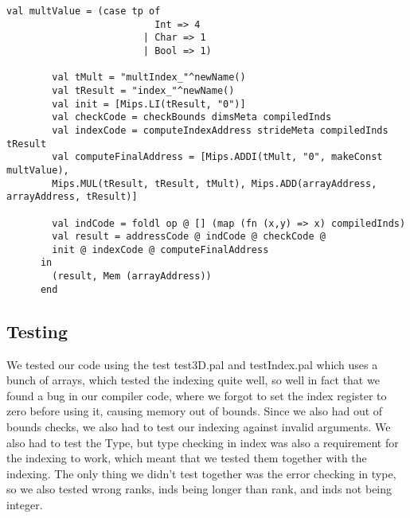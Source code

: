 \begin{lstlisting}[style=MLStyle]
        val multValue = (case tp of
                          Int => 4
                        | Char => 1
                        | Bool => 1)
                          
        val tMult = "multIndex_"^newName()
        val tResult = "index_"^newName()
        val init = [Mips.LI(tResult, "0")]
        val checkCode = checkBounds dimsMeta compiledInds 
        val indexCode = computeIndexAddress strideMeta compiledInds tResult 
        val computeFinalAddress = [Mips.ADDI(tMult, "0", makeConst multValue),
        Mips.MUL(tResult, tResult, tMult), Mips.ADD(arrayAddress, arrayAddress, tResult)] 
  
        val indCode = foldl op @ [] (map (fn (x,y) => x) compiledInds)
        val result = addressCode @ indCode @ checkCode @ 
        init @ indexCode @ computeFinalAddress 
      in
        (result, Mem (arrayAddress)) 
      end	
\end{lstlisting}



\subsection{Testing}
We tested our code using the test test3D.pal and testIndex.pal which uses a bunch of arrays, which tested the indexing quite well, 
so well in fact that we found a bug in our compiler code, where we forgot to set the index register to zero before using it, 
causing memory out of bounds. Since we also had out of bounds checks, we also had to test our indexing against invalid arguments. 
We also had to test the Type, but type checking in index was also a requirement for the indexing to work, 
which meant that we tested them together with the indexing. The only thing we didn't test together was the error checking in type, 
so we also tested wrong ranks, inds being longer than rank, and inds not being integer.



